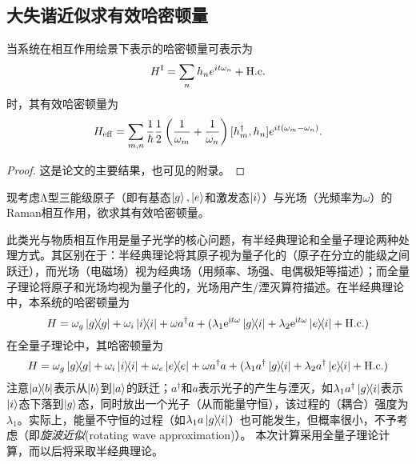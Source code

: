 \documentclass[
fontsetup = font-setup-open.tex,
titlesetup = titles-setup.tex
]{AJbook}
\numberwithin{equation}{section}
\begin{document}
\subsection{大失谐近似求有效哈密顿量}
\begin{lemma}[有效哈密顿量公式]\label{heff}
当系统在相互作用绘景下表示的哈密顿量可表示为
\begin{equation}\label{key}
H^{\mathrm{I}}=\sum_{n}h_ne^{it\omega_n}+\mathrm{H.c.}
\end{equation}
时，其有效哈密顿量为
\begin{equation}\label{key}
H_{\mathrm{eff}}=\sum_{m,n}\frac{1}{\hbar}\frac{1}{2}\left(\frac{1}{\omega_m}+\frac{1}{\omega_n}\right)[h_m^\dagger,h_n]e^{it(\omega_m-\omega_n)}.
\end{equation}
\end{lemma}
\begin{proof}
这是论文\cite{James2007EffectiveHT}的主要结果，也可见\cite{zzmqo}的附录。
\end{proof}

现考虑Λ型三能级原子（即有基态$ \ket{g},\ket{e} $和激发态$ \ket{i} $）与光场（光频率为$ \omega $）的Raman相互作用，欲求其有效哈密顿量。

此类光与物质相互作用是量子光学的核心问题，有半经典理论和全量子理论两种处理方式。其区别在于：半经典理论将其原子视为量子化的（原子在分立的能级之间跃迁），而光场（电磁场）视为经典场（用频率、场强、电偶极矩等描述）；而全量子理论将原子和光场均视为量子化的，光场用产生/湮灭算符描述。在半经典理论中，本系统的哈密顿量为
\begin{equation}\label{key}
H=\omega_g\ketbra{g}{g}+\omega_i\ketbra{i}{i}+\omega a^\dagger a+(\lambda_1\mathrm{e}^{\mathrm{i}t \omega}\ketbra{g}{i}+\lambda_2\mathrm{e}^{\mathrm{i}t \omega}\ketbra{e}{i}+\mathrm{H.c.})
\end{equation}
在全量子理论中，其哈密顿量为
\begin{equation}\label{key}
H=\omega_g\ketbra{g}{g}+\omega_i\ketbra{i}{i}+\omega_e\ketbra{e}{e}+\omega a^\dagger a+(\lambda_1a^\dagger\ketbra{g}{i}+\lambda_2a^\dagger\ketbra{e}{i}+\mathrm{H.c.})
\end{equation}
注意$ \ketbra{a}{b} $表示从$ \ket{b} $到$ \ket{a} $的跃迁；$ a^\dagger $和$ a $表示光子的产生与湮灭，如$ \lambda_1a^\dagger\ketbra{g}{i} $表示$ \ket{i} $态下落到$ \ket{g} $态，同时放出一个光子（从而能量守恒），该过程的（耦合）强度为$ \lambda_1 $。实际上，能量不守恒的过程（如$ \lambda_1a\ketbra{g}{i} $）也可能发生，但概率很小，不予考虑（即\emph{旋波近似}(rotating wave approximation)）。
本次计算采用全量子理论计算，而以后将采取半经典理论。
\end{document}
